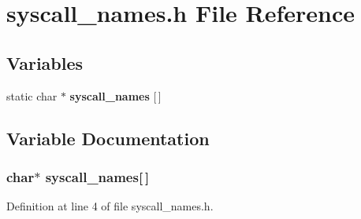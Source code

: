 \section{syscall\_\-names.h File Reference}
\label{syscall__names_8h}
\subsection*{Variables}
\begin{CompactItemize}
\item 
static char $\ast$ {\bf syscall\_\-names} [$\,$]
\end{CompactItemize}


\subsection{Variable Documentation}
\subsubsection[{syscall\_\-names}]{\setlength{\rightskip}{0pt plus 5cm}char$\ast$ {\bf syscall\_\-names}[$\,$]\hspace{0.3cm}{\tt  [static]}}\label{syscall__names_8h_972f35ebc5ff6560f1b3e1b5ff903ccf}




Definition at line 4 of file syscall\_\-names.h.